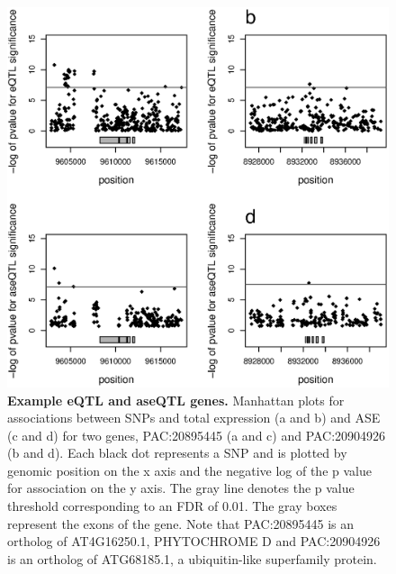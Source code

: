 \begin{figure}[ht]
      \centering
       \includegraphics[width=\linewidth]{Ch3Examples}
    \caption{\textbf{Example eQTL and aseQTL genes.} Manhattan plots for associations between SNPs and total expression (a and b) and ASE (c and d) for two genes, PAC:20895445 (a and c) and PAC:20904926 (b and d). Each black dot represents a SNP and is plotted by genomic position on the x axis and the negative log of the p value for association on the y axis. The gray line denotes the p value threshold corresponding to an FDR of 0.01. The gray boxes represent the exons of the gene. Note that PAC:20895445 is an ortholog of AT4G16250.1, PHYTOCHROME D and PAC:20904926 is an ortholog of ATG68185.1, a ubiquitin-like superfamily protein.}
    \label{fig:3figS3}
\end{figure}

